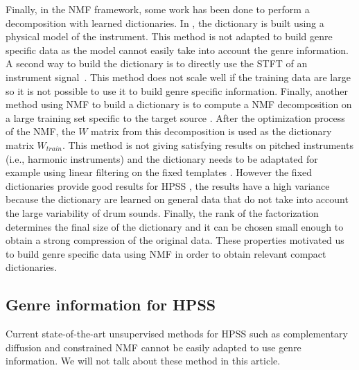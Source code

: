 \documentclass{article}
\begin{document}
Finally, in the NMF framework, some work has been done to perform a decomposition with learned dictionaries. In \cite{hennequin2011score}, the dictionary is built using a physical model of the instrument. This method is not adapted to build genre specific data as the model cannot easily take into account the genre information. 
A second way to build the dictionary is to directly use the STFT of an instrument signal~\cite{wudrum}. This method does not scale well if the training data are large so it is not possible to use it to build genre specific information. 
Finally, another method using NMF to build a dictionary is to compute a NMF decomposition on a large training set specific to the target source \cite{schmidt2006single}. After the optimization process of the NMF, the $W$ matrix from this decomposition is used as the dictionary matrix $W_{train}$. This method is not giving satisfying results on pitched instruments (i.e., harmonic instruments) and the dictionary needs to be adaptated for example using linear filtering on the fixed templates \cite{jaureguiberry2011adaptation}. However the fixed dictionaries provide good results for HPSS \cite{larocheJournalhidden}, the results have a high variance because the dictionary are learned on general data that do not take into account the large variability of drum sounds. Finally, the rank of the factorization determines the final size of the dictionary and it can be chosen small enough to obtain a strong compression of the original data. These properties motivated us to build genre specific data using NMF in order to obtain relevant compact dictionaries. 



\subsection{Genre information for HPSS}

Current state-of-the-art unsupervised methods for HPSS such as complementary diffusion \cite{ono2008separation} and constrained NMF \cite{canadas2014percussive} cannot be easily adapted to use genre information. We will not talk about these method in this article. 
\end{document}
